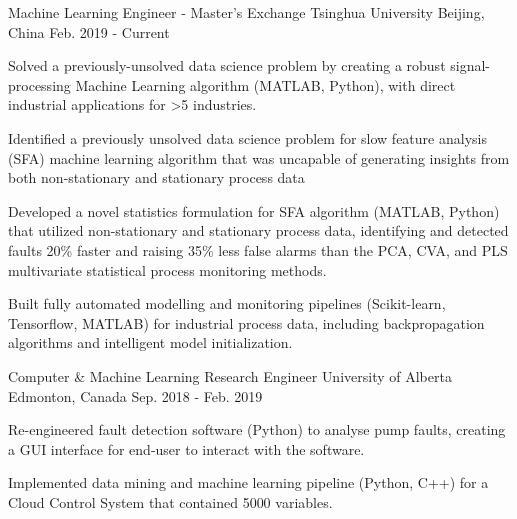 

\begin{cventries}

  \cventry
    {Machine Learning Engineer - Master's Exchange} %
    {Tsinghua University} %
    {Beijing, China} %
    {Feb. 2019 - Current} %
    {
      \begin{cvitems} %
        \item {Solved a previously-unsolved data science problem by creating a robust signal-processing Machine Learning algorithm (MATLAB, Python), with direct industrial applications for >5 industries.}
        \item{Identified a previously unsolved data science problem for slow feature analysis (SFA) machine learning algorithm that was uncapable of generating insights from both non-stationary and stationary process data}
        \item {Developed a novel statistics formulation for SFA algorithm (MATLAB, Python) that utilized non-stationary and stationary process data, identifying and detected faults 20\% faster and raising 35\% less false alarms than the PCA, CVA, and PLS multivariate statistical process monitoring methods.}
        \item {Built fully automated modelling and monitoring pipelines (Scikit-learn, Tensorflow, MATLAB) for industrial process data, including backpropagation algorithms and intelligent model initialization.}
      \end{cvitems}
    }

  \cventry
    {Computer \& Machine Learning Research Engineer} %
    {University of Alberta} %
    {Edmonton, Canada} %
    {Sep. 2018 - Feb. 2019} %
    {
      \begin{cvitems} %
        \item {Re-engineered fault detection software (Python) to analyse pump faults, creating a GUI interface for end-user to interact with the software.}
        \item {Implemented data mining and machine learning pipeline (Python, C++) for a Cloud Control System that contained 5000 variables.}
      \end{cvitems}
    }


\end{cventries}
